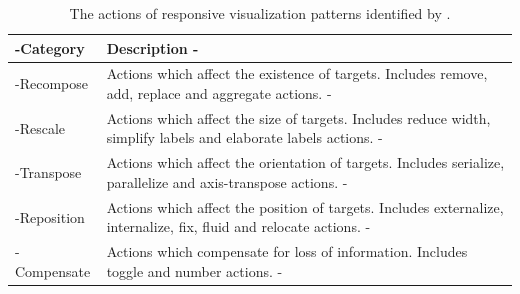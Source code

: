 \begin{table}[tp]
\tablestretch
{}
\centering
\begin{tabularx}{\linewidth}{>{\kern-\tabcolsep}lX<{\kern-\tabcolsep}}
\toprule
Category & Description \\
\midrule
Recompose & Actions which affect the existence of targets. Includes remove, add, replace and aggregate actions. \\
Rescale & Actions which affect the size of targets. Includes reduce width, simplify labels and elaborate labels actions. \\
Transpose & Actions which affect the orientation of targets. Includes serialize, parallelize and axis-transpose actions. \\
Reposition & Actions which affect the position of targets. Includes externalize, internalize, fix, fluid and relocate actions. \\
Compensate & Actions which compensate for loss of information. Includes toggle and number actions. \\
\bottomrule
\end{tabularx}
\caption[Actions of Responsive Visualization Patterns]{%
The actions of responsive visualization patterns identified by
\textcite{DesignPatternsTradeOffsRespVis}.
}
\label{tab:PatternsActions}
\end{table}



















